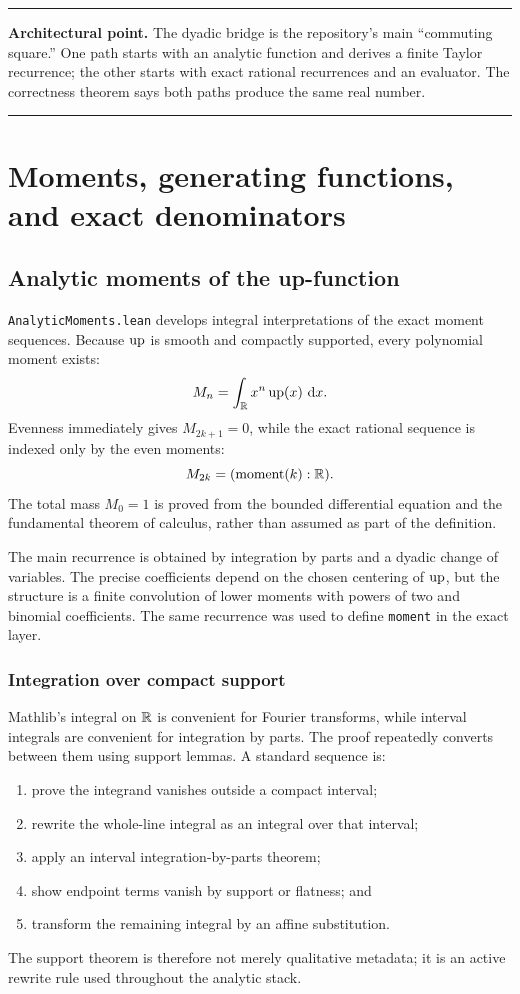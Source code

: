 \documentclass[11pt,oneside]{article}
\theoremstyle{definition}
\theoremstyle{remark}
\newenvironment{boxedremark}{%
  \par\smallskip\noindent\begin{center}\begin{minipage}{0.94\textwidth}%
  \color{black}\hrule\vspace{0.6em}\small
}{%
  \vspace{0.6em}\hrule\end{minipage}\end{center}\smallskip
}
\begin{document}
\begin{boxedremark}\textbf{Architectural point.}\space
The dyadic bridge is the repository's main ``commuting square.''  One path starts with an analytic function and derives a finite Taylor recurrence; the other starts with exact rational recurrences and an evaluator.  The correctness theorem says both paths produce the same real number.
\end{boxedremark}

\section{Moments, generating functions, and exact denominators}\label{ch:moments}

\subsection{Analytic moments of the up-function}
\nolinkurl{AnalyticMoments.lean} develops integral interpretations of the exact moment sequences.  Because \(\operatorname{up}\) is smooth and compactly supported, every polynomial moment exists:
\[
  M_n=\int_{\mathbb{R}}x^n\operatorname{up}(x)\,\mathop{}\!\mathrm{d} x.
\]
Evenness immediately gives \(M_{2k+1}=0\), while the exact rational sequence is indexed only by the even moments:
\[
  M_{2k}=(\operatorname{moment}(k):\mathbb{R}).
\]
The total mass \(M_0=1\) is proved from the bounded differential equation and the fundamental theorem of calculus, rather than assumed as part of the definition.

The main recurrence is obtained by integration by parts and a dyadic change of variables.  The precise coefficients depend on the chosen centering of \(\operatorname{up}\), but the structure is a finite convolution of lower moments with powers of two and binomial coefficients.  The same recurrence was used to define \nolinkurl{moment} in the exact layer.

\subsubsection{Integration over compact support}
Mathlib's integral on \(\mathbb{R}\) is convenient for Fourier transforms, while interval integrals are convenient for integration by parts.  The proof repeatedly converts between them using support lemmas.  A standard sequence is:
\begin{enumerate}
  \item prove the integrand vanishes outside a compact interval;
  \item rewrite the whole-line integral as an integral over that interval;
  \item apply an interval integration-by-parts theorem;
  \item show endpoint terms vanish by support or flatness; and
  \item transform the remaining integral by an affine substitution.
\end{enumerate}
The support theorem is therefore not merely qualitative metadata; it is an active rewrite rule used throughout the analytic stack.
\end{document}
